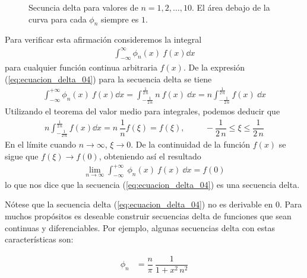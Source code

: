 \begin{figure}[H]
\centering

\caption{Secuncia delta para valores de $n=1,2,\ldots,10$. El área debajo de la curva para cada $\phi_{n}$ siempre es $1$.}
\label{fig:secuncia_delta_01}
\end{figure}
Para verificar esta afirmación consideremos la integral
\begin{align*}
\int_{-\infty}^{\infty} \phi_{n} (x) \: f(x) \dd{x}
\end{align*}
para cualquier función continua arbitraria $f(x)$. De la expresión (\ref{eq:ecuacion_delta_04}) para la secuencia delta se tiene
\begin{align*}
\int_{-\infty}^{+ \infty} \phi_{n} (x) \: f(x) \dd{x} = \int_{-\frac{1}{2 \, n}}^{\frac{1}{2 \, n}} n \: f(x) \: \dd{x} = n \int_{-\frac{1}{2 \, n}}^{\frac{1}{2 \, n}} f(x) \:  \dd{x}
\end{align*}
Utilizando el teorema del valor medio para integrales, podemos deducir que
\begin{align*}
n \int_{-\frac{1}{2 \, n}}^{\frac{1}{2 \, n}} f(x) \dd{x} = n \: \dfrac{1}{n} f(\xi) = f(\xi), \hspace{1cm} - \dfrac{1}{2 \, n} \leq \xi \leq \dfrac{1}{2 \, n}
\end{align*}
En el límite cuando $n \to \infty$, $\xi \to 0$. De la continuidad de la función $f(x)$ se sigue que $f(\xi) \to f(0)$, obteniendo así el resultado
\begin{align*}
\lim_{n \to \infty} \int_{-\infty}^{+ \infty} \: \phi_{n}(x) \: f(x) \: \dd{x} = f(0)
\end{align*}
lo que nos dice que la secuencia (\ref{eq:ecuacion_delta_04}) es una secuencia delta.
\par
Nótese que la secuencia delta (\ref{eq:ecuacion_delta_04}) no es derivable en $0$. Para muchos propósitos es deseable
construir secuencias delta de funciones que sean continuas y diferenciables. Por ejemplo, algunas secuencias delta con estas características son:
\\
\begin{minipage}{4cm}
\begin{align*}
\phi_{n} &= \dfrac{n}{\pi} \: \dfrac{1}{1 + x^{2} \, n^{2}}
\end{align*}
\end{minipage}
\hspace{1cm}
